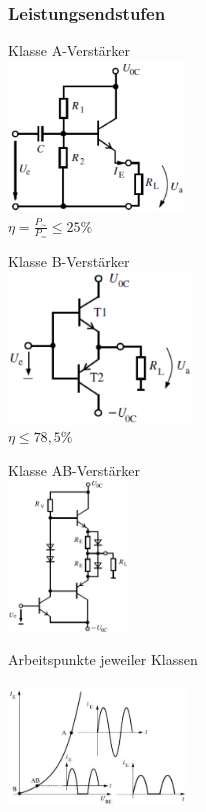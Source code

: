          \subsubsection{Leistungsendstufen}
             \begin{minipage}[T]{4.7cm}
                 Klasse A-Verstärker \\
                 \includegraphics[height=4cm]{./images/KlassA_Amp.png} \\
                 	$ \eta = \frac{P_\sim}{P_=} \leq 25 \% $
             \end{minipage}
             \begin{minipage}[T]{4.7cm}
                 Klasse B-Verstärker \\
                 \includegraphics[height=4cm]{./images/KlassB_Amp.png} \\
                 	$ \eta \leq 78,5 \% $
             \end{minipage}
             \begin{minipage}[T]{4.7cm}
                 Klasse AB-Verstärker\\
                 \includegraphics[height=4cm]{./images/KlassAB_Amp.png}
             \end{minipage}
             \begin{minipage}[T]{4.7cm}
                 Arbeitspunkte jeweiler Klassen\\\\
                 \vspace{5mm}
                 \includegraphics[width=4.7cm]{./images/EndstufenAP.png}
             \end{minipage}		